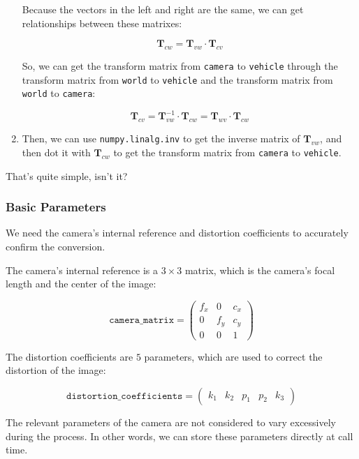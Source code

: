 \documentclass{article}
\begin{document}
\begin{enumerate}
  Because the vectors in the left and right are the same, we can get relationships between these matrixes:

  \begin{equation}
    \boldsymbol{T}_{cw} = \boldsymbol{T}_{vw}\cdot\boldsymbol{T}_{cv}
  \end{equation}

  So, we can get the transform matrix from \texttt{camera} to \texttt{vehicle} through the transform matrix from \texttt{world} to \texttt{vehicle} and the transform matrix from \texttt{world} to \texttt{camera}:

  \begin{equation}
    \boldsymbol{T}_{cv} = \boldsymbol{T}^{-1}_{vw}\cdot\boldsymbol{T}_{cw} = \boldsymbol{T}_{wv}\cdot\boldsymbol{T}_{cw}
  \end{equation}

  \item Then, we can use \texttt{numpy.linalg.inv} to get the inverse matrix of $\boldsymbol{T}_{vw}$, and then dot it with $\boldsymbol{T}_{cw}$ to get the transform matrix from \texttt{camera} to \texttt{vehicle}.
\end{enumerate}

That's quite simple, isn't it?

\subsubsection{Basic Parameters}
We need the camera's internal reference and distortion coefficients to accurately confirm the conversion.

The camera's internal reference is a $3\times3$ matrix, which is the camera's focal length and the center of the image:

\[
  \texttt{camera\_matrix}=\left(\begin{matrix}
    f_x & 0 & c_x \\
    0 & f_y & c_y \\
    0 & 0 & 1
  \end{matrix}\right)
\]

The distortion coefficients are $5$ parameters, which are used to correct the distortion of the image:

\[
  \texttt{distortion\_coefficients}=\left(\begin{matrix}
    k_1 & k_2 & p_1 & p_2 & k_3
  \end{matrix}\right)
\]

The relevant parameters of the camera are not considered to vary excessively during the process. In other words, we can store these parameters directly at call time.
\end{document}
